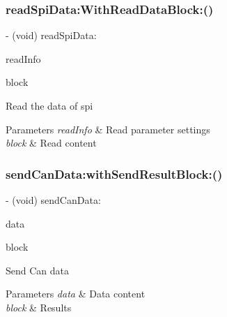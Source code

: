 \subsubsection{\texorpdfstring{read\+Spi\+Data\+:\+With\+Read\+Data\+Block\+:()}{readSpiData:WithReadDataBlock:()}}
{\footnotesize\ttfamily -\/ (void) read\+Spi\+Data\+: \begin{DoxyParamCaption}\item[{(\hyperlink{struct_p_v_s_d_k___m_o_u_n_t_a_p_i___r_e_a_d_s_p_i___d_a_t_a}{P\+V\+S\+D\+K\+\_\+\+M\+O\+U\+N\+T\+A\+P\+I\+\_\+\+R\+E\+A\+D\+S\+P\+I\+\_\+\+D\+A\+TA})}]{read\+Info }\item[{WithReadDataBlock:(P\+V\+S\+D\+K\+Read\+Spi\+Data\+Block)}]{block }\end{DoxyParamCaption}}

Read the data of spi


\begin{DoxyParams}{Parameters}
{\em read\+Info} & Read parameter settings \\
\hline
{\em block} & Read content \\
\hline
\end{DoxyParams}
\mbox{\label{interface_p_v_mount_a91446ecdf826731976b137f032fdd9d6}} 
\subsubsection{\texorpdfstring{send\+Can\+Data\+:with\+Send\+Result\+Block\+:()}{sendCanData:withSendResultBlock:()}}
{\footnotesize\ttfamily -\/ (void) send\+Can\+Data\+: \begin{DoxyParamCaption}\item[{(\hyperlink{struct_p_v_s_d_k___m_o_u_n_t_a_p_i___c_a_n___d_a_t_a}{P\+V\+S\+D\+K\+\_\+\+M\+O\+U\+N\+T\+A\+P\+I\+\_\+\+C\+A\+N\+\_\+\+D\+A\+TA})}]{data }\item[{withSendResultBlock:(P\+V\+Send\+Data\+Result\+Block)}]{block }\end{DoxyParamCaption}}

Send Can data


\begin{DoxyParams}{Parameters}
{\em data} & Data content \\
\hline
{\em block} & Results \\
\hline
\end{DoxyParams}
\mbox{\label{interface_p_v_mount_a01e42f8ec2b5dab140fd886fa5e0e362}} 
